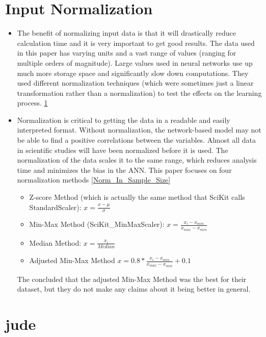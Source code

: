 \section{Input Normalization}\label{Input_Normalization}

\begin{itemize}
\item The benefit of normalizing input data is that it will drastically reduce calculation time and it is very important to get good results. The data used in this paper has varying units and a vast range of values (ranging for multiple orders of magnitude). Large values used in neural networks use up much more storage space and significantly slow down computations. They used different normalization techniques (which were sometimes just a linear transformation rather than a normalization) to test the effects on the learning process. \ref{Input_Normalization}
\item Normalization is critical to getting the data in a readable and easily interpreted format. Without normalization, the network-based model may not be able to find a positive correlations between the variables. Almost all data in scientific studies will have been normalized before it is used. The normalization of the data scales it to the same range, which reduces analysis time and minimizes the bias in the ANN. This paper focuses on four normalization methods \ref{Norm_In_Sample_Size}
\begin{itemize}
\item Z-score Method (which is actually the same method that SciKit calls StandardScaler): $x=\frac{x-\mu}{\sigma}$
\item Min-Max Method (SciKit\_MinMaxScaler): $x = \frac{x_i-x_{min}}{x_{max}-x_{min}}$
\item Median Method: $x = \frac{x_i}{Median} $
\item Adjusted Min-Max Method $x = 0.8*\frac{x_i-x_{min}}{x_{max}-x_{min}} + 0.1$
\end{itemize}
The concluded that the adjusted Min-Max Method was the best for their dataset, but they do not make any claims about it being better in general.

\end{itemize}

\section{jude}

